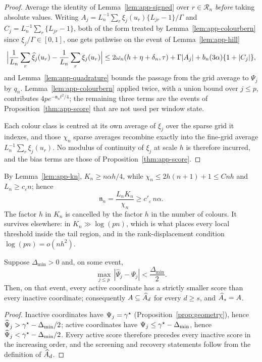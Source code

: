 \begin{proof}
Average the identity of Lemma~\ref{lem:app-signed} over $r\in\mathcal R_n$
\emph{before} taking absolute values.  Writing
$A_j=L_n^{-1}\sum_r\xi_j(u_r)\{L_{jr}-1\}/\Gamma$ and
$C_j=L_n^{-1}\sum_r\{L_{jr}-1\}$, both of the form treated by
Lemma~\ref{lem:app-colourbern} since $\xi_j/\Gamma\in[0,1]$, one gets
pathwise on the event of Lemma~\ref{lem:app-hill}
\[
 \Bigl|\frac1{L_n}\sum_{r}\widehat\xi_j(u_r)-\frac1{L_n}\sum_r\xi_j(u_r)\Bigr|
 \le2\omega_n(h+\eta+\delta_n,\tau)+\Gamma|A_j|
   +b_n(3\alpha)\{1+|C_j|\},
\]
and Lemma~\ref{lem:app-quadrature} bounds the passage from the grid
average to $\Psi_j$ by $q_n$.  Lemma~\ref{lem:app-colourbern} applied
twice, with a union bound over $j\le p$, contributes
$4pe^{-\mathfrak n_nt^2/4}$; the remaining three terms are the events of
Proposition~\ref{thm:app-score} that are not used per window state.

Each colour class is centred at its own average of $\xi_j$ over the
sparse grid it indexes, and those $\chi_n$ sparse averages recombine
exactly into the fine-grid average $L_n^{-1}\sum_r\xi_j(u_r)$.  No
modulus of continuity of $\xi_j$ at scale $h$ is therefore incurred,
and the bias terms are those of Proposition~\ref{thm:app-score}.
\end{proof}

\begin{remark}\label{rem:app-hgone}
By Lemma~\ref{lem:app-kn}, $K_n\ge n\alpha h/4$, while
$\chi_n\le2h(n+1)+1\le Cnh$ and $L_n\ge c_\varepsilon n$; hence
\[
 \mathfrak n_n=\frac{L_nK_n}{\chi_n}\ge c'_\varepsilon\,n\alpha .
\]
The factor $h$ in $K_n$ is cancelled by the factor $h$ in the number of
colours.  It survives elsewhere: in $K_n\gg\log(pn)$, which is what
places every local threshold inside the tail region, and in the
rank-displacement condition $\log(pn)=o(nh^2)$.
\end{remark}

\begin{lemma}\label{lem:app-separation}
Suppose $\Delta_{\min}>0$ and, on some event,
\[
 \max_{j\le p}\,|\widehat\Psi_j-\Psi_j|<\frac{\Delta_{\min}}{2}.
\]
Then, on that event, every active coordinate has a strictly smaller
score than every inactive coordinate; consequently
$A\subseteq\widehat{A}_d$ for every $d\ge s$, and
$\widehat{A}_s=A$.
\end{lemma}

\begin{proof}
Inactive coordinates have $\Psi_j=\gamma^\star$
(Proposition~\ref{prop:geometry}), hence
$\widehat\Psi_j>\gamma^\star-\Delta_{\min}/2$; active coordinates have
$\Psi_j\le\gamma^\star-\Delta_{\min}$, hence
$\widehat\Psi_j<\gamma^\star-\Delta_{\min}/2$.  Every active score therefore
precedes every inactive score in the increasing order, and the screening
and recovery statements follow from the definition of
$\widehat{A}_d$.
\end{proof}
